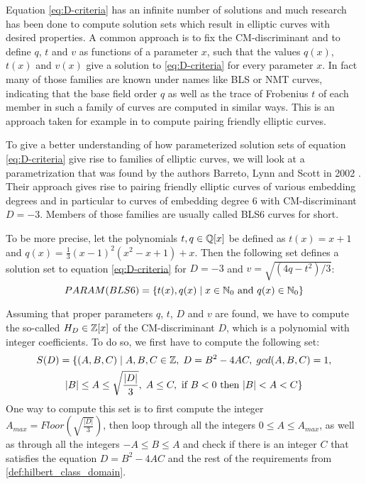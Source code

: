 Equation \ref{eq:D-criteria} has an infinite number of solutions and much research has been done to compute solution sets which result in elliptic curves with desired properties. A common approach is to fix the CM-discriminant and to define $q$, $t$ and $v$ as functions of a parameter $x$, such that the values $q(x)$, $t(x)$ and $v(x)$ give a solution to \ref{eq:D-criteria} for every parameter $x$. In fact many of those families are known under names like BLS \cite{bls-02} or NMT \cite{mnt-84} curves, indicating that the base field order $q$ as well as the trace of Frobenius $t$ of each member in such a family of curves are computed in similar ways. This is an approach taken for example in \cite{freeman-06} to compute pairing friendly elliptic curves.
\begin{example}
\label{ex:bls6-params} To give a better understanding of how parameterized solution sets of equation \ref{eq:D-criteria} give rise to families of elliptic curves, we will look at a parametrization that was found by the authors Barreto, Lynn and Scott in 2002 \cite{bls-02}. Their approach gives rise to pairing friendly elliptic curves of various embedding degrees and in particular to curves of embedding degree $6$ with CM-discriminant $D=-3$. Members of those families are usually called BLS6 curves for short. 

To be more precise, let the polynomials $t,q\in \mathbb{Q}[x]$ be defined as $t(x)=x+1$ and $q(x) = \frac{1}{3}(x-1)^2(x^2-x+1) + x$. Then the following set defines a solution set to equation \ref{eq:D-criteria} for $D=-3$ and $v= \sqrt{(4 q - t^2)/3}$: 
\begin{equation}
PARAM(BLS6) = \{t(x), q(x) \;|\; x\in \mathbb{N}_0 \text{ and } q(x)\in\mathbb{N}_0\}
\end{equation}  
\end{example}

Assuming that proper parameters $q$, $t$, $D$ and $v$ are found, we have to compute the so-called  $H_D\in \mathbb{Z}[x]$ of the CM-discriminant $D$, which is a polynomial with integer coefficients. To do so, we first have to compute the following set:
\begin{multline*}
\label{def:hilbert_class_domain}
S(D)=\{(A,B,C)\;|\; A,B,C\in\mathbb{Z},\; D = B^2-4AC,\; gcd(A,B,C)=1, \\
|B|\leq A \leq \sqrt{\frac{|D|}{3}},\; A\leq C, 
\text{ if } B< 0 \text{ then } |B| < A < C\}
\end{multline*}
One way to compute this set is to first compute the integer $A_{max}= Floor(\sqrt{\frac{|D|}{3}})$, then loop through all the integers $0\leq A\leq A_{max}$, as well as through all the integers $-A\leq B \leq A$ and check if there is an integer $C$ that satisfies the equation $D = B^2-4AC$ and the rest of the requirements from \ref{def:hilbert_class_domain}.

